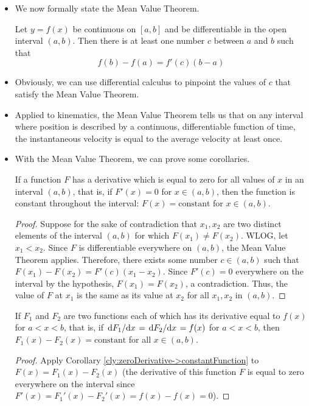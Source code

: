 \documentclass[../main.tex]{subfiles}
\begin{document}
\begin{itemize}
\begin{itemize}
    \end{itemize}
    \item We now formally state the Mean Value Theorem.
    \begin{thm}
        Let $y=f(x)$ be continuous on $[a,b]$ and be differentiable in the open interval $(a,b)$. Then there is at least one number $c$ between $a$ and $b$ such that
        \begin{equation*}
            f(b)-f(a) = f'(c)(b-a)
        \end{equation*}
    \end{thm}
    \item Obviously, we can use differential calculus to pinpoint the values of $c$ that satisfy the Mean Value Theorem.
    \item Applied to kinematics, the Mean Value Theorem tells us that on any interval where position is described by a continuous, differentiable function of time, the instantaneous velocity is equal to the average velocity at least once.
    \item With the Mean Value Theorem, we can prove some corollaries.
    \begin{cly}\label{cly:zeroDerivative->constantFunction}
        If a function $F$ has a derivative which is equal to zero for all values of $x$ in an interval $(a,b)$, that is, if $F'(x)=0$ for $x\in(a,b)$, then the function is constant throughout the interval: $F(x)=\text{constant}$ for $x\in(a,b)$.
        \begin{proof}
            Suppose for the sake of contradiction that $x_1,x_2$ are two distinct elements of the interval $(a,b)$ for which $F(x_1)\neq F(x_2)$. WLOG, let $x_1<x_2$. Since $F$ is differentiable everywhere on $(a,b)$, the Mean Value Theorem applies. Therefore, there exists some number $c\in(a,b)$ such that $F(x_1)-F(x_2)=F'(c)(x_1-x_2)$. Since $F'(c)=0$ everywhere on the interval by the hypothesis, $F(x_1)=F(x_2)$, a contradiction. Thus, the value of $F$ at $x_1$ is the same as its value at $x_2$ for all $x_1,x_2$ in $(a,b)$. 
        \end{proof}
    \end{cly}
    \begin{cly}
        If $F_1$ and $F_2$ are two functions each of which has its derivative equal to $f(x)$ for $a<x<b$, that is, if $\dv*{F_1}{x}=\dv*{F_2}{x}=f(x)$ for $a<x<b$, then $F_1(x)-F_2(x)=\text{constant}$ for all $x\in(a,b)$.
        \begin{proof}
            Apply Corollary \ref{cly:zeroDerivative->constantFunction} to $F(x)=F_1(x)-F_2(x)$ (the derivative of this function $F$ is equal to zero everywhere on the interval since $F'(x)=F_1'(x)-F_2'(x)=f(x)-f(x)=0$).

\end{proof}
\end{cly}
\end{itemize}
\end{document}
